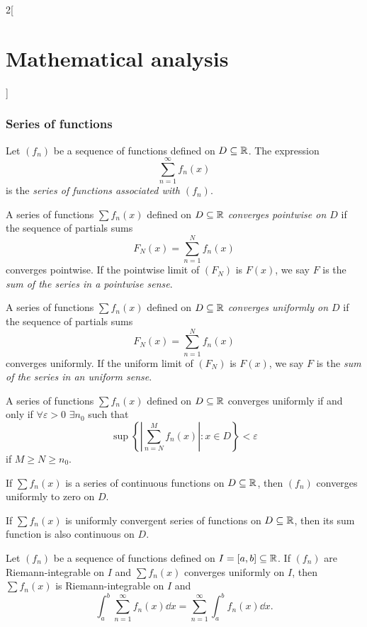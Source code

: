 \documentclass[../../../main.tex]{subfiles}
\begin{document}
\begin{multicols}{2}[\section{Mathematical analysis}]
\subsubsection*{Series of functions}
\begin{definition}
Let $(f_n)$ be a sequence of functions defined on $D\subseteq\mathbb{R} $. The expression $$\sum_{n=1}^\infty f_n(x)$$ is the \textit{series of functions associated with $(f_n)$}.
\end{definition}
\begin{definition}
A series of functions $\sum f_n(x)$ defined on $D\subseteq\mathbb{R} $ \textit{converges pointwise on $D$} if the sequence of partials sums $$F_N(x)=\sum_{n=1}^Nf_n(x)$$ converges pointwise. If the pointwise limit of $(F_N)$ is $F(x)$, we say $F$ is the \textit{sum of the series in a pointwise sense}.
\end{definition}
\begin{definition}
A series of functions $\sum f_n(x)$ defined on $D\subseteq\mathbb{R} $ \textit{converges uniformly on $D$} if the sequence of partials sums $$F_N(x)=\sum_{n=1}^Nf_n(x)$$ converges uniformly. If the uniform limit of $(F_N)$ is $F(x)$, we say $F$ is the \textit{sum of the series in an uniform sense}.
\end{definition}
\begin{theorem}
A series of functions $\sum f_n(x)$ defined on $D\subseteq\mathbb{R} $ converges uniformly if and only if $\forall\varepsilon>0$ $\exists n_0$ such that $$\sup\left\{\left|\sum_{n=N}^Mf_n(x)\right|:x\in D\right\}< \varepsilon$$ if $M\geq N\geq n_0$.
\end{theorem}
\begin{corollary}
If $\sum f_n(x)$ is a series of continuous functions on $D\subseteq\mathbb{R} $, then $(f_n)$ converges uniformly to zero on $D$.
\end{corollary}
\begin{theorem}
If $\sum f_n(x)$ is uniformly convergent series of functions on $D\subseteq\mathbb{R} $, then its sum function is also continuous on $D$.
\end{theorem}
\begin{theorem}
Let $(f_n)$ be a sequence of functions defined on $I=[a,b]\subseteq\mathbb{R} $. If $(f_n)$ are Riemann-integrable on $I$ and $\sum f_n(x)$ converges uniformly on $I$, then $\sum f_n(x)$ is Riemann-integrable on $I$ and $$\int_a^b\sum_{n=1}^\infty f_n(x) \dd x=\sum_{n=1}^\infty \int_a^bf_n(x) \dd x.$$
\end{theorem}
\begin{theorem}

\end{theorem}
\end{multicols}
\end{document}
